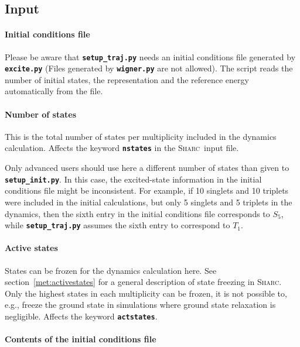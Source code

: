 \documentclass[a4paper,10pt,DIV=15,openany,twoside=false]{scrbook}
\newcommand{\sharc}{\textsc{Sharc}}
\newcommand{\ttt}[1]{\textbf{\texttt{#1}}}
\begin{document}
\subsection{Input}

\paragraph{Initial conditions file}

Please be aware that \ttt{setup\_traj.py} needs an initial conditions file generated by \ttt{excite.py} (Files generated by \ttt{wigner.py} are not allowed). The script reads the number of initial states, the representation and the reference energy automatically from the file.

\paragraph{Number of states}

This is the total number of states per multiplicity included in the dynamics calculation. Affects the keyword \ttt{nstates} in the \sharc\ input file.

Only advanced users should use here a different number of states than given to \ttt{setup\_init.py}. In this case, the excited-state information in the initial conditions file might be inconsistent. For example, if 10 singlets and 10 triplets were included in the initial calculations, but only 5 singlets and 5 triplets in the dynamics, then the sixth entry in the initial conditions file corresponds to $S_5$, while \ttt{setup\_traj.py} assumes the sixth entry to correspond to $T_1$.

\paragraph{Active states}

States can be frozen for the dynamics calculation here. See section~\ref{met:activestates} for a general description of state freezing in \sharc. Only the highest states in each multiplicity can be frozen, it is not possible to, e.g., freeze the ground state in simulations where ground state relaxation is negligible. Affects the keyword \ttt{actstates}.

\paragraph{Contents of the initial conditions file}
\end{document}
